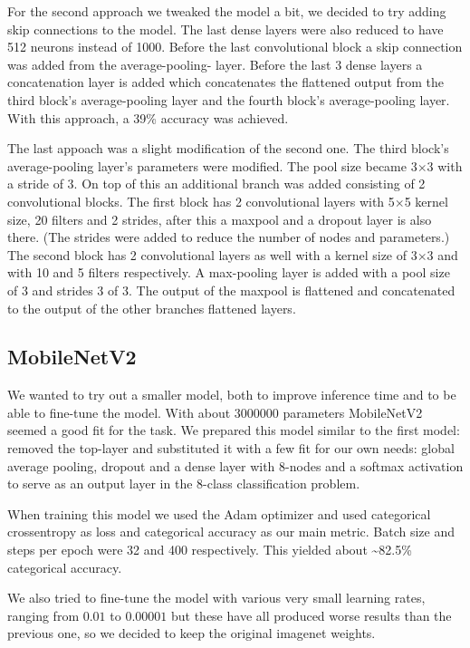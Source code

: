 \documentclass[twocolumn]{article}
\begin{document}
	For the second approach we tweaked the model a bit, we decided to try adding skip connections to the model. The last dense layers were also reduced to have 512 neurons instead of 1000.
	Before the last convolutional block a skip connection was added from the average-pooling- layer. Before the last 3 dense layers a concatenation layer is added which concatenates the flattened output from the third block's average-pooling layer and the fourth block's average-pooling layer.
	With this approach, a 39\% accuracy was achieved.
	
	The last appoach was a slight modification of the second one.
	The third block's average-pooling layer's parameters were modified. The pool size became 3$\times$3 with a stride of 3. On top of this an additional branch was added consisting of 2 convolutional blocks. The first block has 2 convolutional layers with 5$\times$5 kernel size, 20 filters and 2 strides, after this a maxpool and a dropout layer is also there. (The strides were added to reduce the number of nodes and parameters.) 
	The second block has 2 convolutional layers as well with a kernel size of 3$\times$3 and with 10 and 5 filters respectively. A max-pooling layer is added with a pool size of 3 and strides 3 of 3. The output of the maxpool is flattened and concatenated to the output of the other branches flattened layers.
	
	
	\subsection{MobileNetV2}
	
	We wanted to try out a smaller model, both to improve inference time and to be able to fine-tune the model. With about $3000000$ parameters MobileNetV2 seemed a good fit for the task. We prepared this model similar to the first model: removed the top-layer and substituted it with a few fit for our own needs: global average pooling, dropout and a dense layer with 8-nodes and a softmax activation to serve as an output layer in the 8-class classification problem.
	
	When training this model we used the Adam optimizer and used categorical crossentropy as loss and categorical accuracy as our main metric. Batch size and steps per epoch were 32 and 400 respectively. This yielded about \textasciitilde82.5\% categorical accuracy.
	
	We also tried to fine-tune the model with various very small learning rates, ranging from $0.01$ to $0.00001$ but these have all produced worse results than the previous one, so we decided to keep the original imagenet weights.
	
\end{document}
